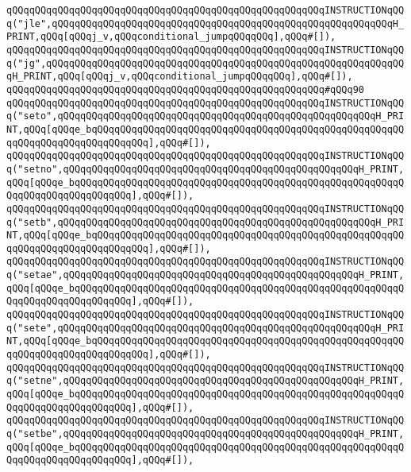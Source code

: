 \verb|qQQqqQQqqQQqqQQqqQQqqQQqqQQqqQQqqQQqqQQqqQQqqQQqqQQqqQQqINSTRUCTIONqQQq("jle",qQQqqQQqqQQqqQQqqQQqqQQqqQQqqQQqqQQqqQQqqQQqqQQqqQQqqQQqqQQqH_PRINT,qQQq[qQQqj_v,qQQqconditional_jumpqQQqqQQq],qQQq#[]),|\newline
\verb|qQQqqQQqqQQqqQQqqQQqqQQqqQQqqQQqqQQqqQQqqQQqqQQqqQQqqQQqINSTRUCTIONqQQq("jg",qQQqqQQqqQQqqQQqqQQqqQQqqQQqqQQqqQQqqQQqqQQqqQQqqQQqqQQqqQQqqQQqH_PRINT,qQQq[qQQqj_v,qQQqconditional_jumpqQQqqQQq],qQQq#[]),|\newline
\verb|qQQqqQQqqQQqqQQqqQQqqQQqqQQqqQQqqQQqqQQqqQQqqQQqqQQqqQQq#qQQq90|\newline
\verb|qQQqqQQqqQQqqQQqqQQqqQQqqQQqqQQqqQQqqQQqqQQqqQQqqQQqqQQqINSTRUCTIONqQQq("seto",qQQqqQQqqQQqqQQqqQQqqQQqqQQqqQQqqQQqqQQqqQQqqQQqqQQqqQQqH_PRINT,qQQq[qQQqe_bqQQqqQQqqQQqqQQqqQQqqQQqqQQqqQQqqQQqqQQqqQQqqQQqqQQqqQQqqQQqqQQqqQQqqQQqqQQqqQQq],qQQq#[]),|\newline
\verb|qQQqqQQqqQQqqQQqqQQqqQQqqQQqqQQqqQQqqQQqqQQqqQQqqQQqqQQqINSTRUCTIONqQQq("setno",qQQqqQQqqQQqqQQqqQQqqQQqqQQqqQQqqQQqqQQqqQQqqQQqqQQqH_PRINT,qQQq[qQQqe_bqQQqqQQqqQQqqQQqqQQqqQQqqQQqqQQqqQQqqQQqqQQqqQQqqQQqqQQqqQQqqQQqqQQqqQQqqQQqqQQq],qQQq#[]),|\newline
\verb|qQQqqQQqqQQqqQQqqQQqqQQqqQQqqQQqqQQqqQQqqQQqqQQqqQQqqQQqINSTRUCTIONqQQq("setb",qQQqqQQqqQQqqQQqqQQqqQQqqQQqqQQqqQQqqQQqqQQqqQQqqQQqqQQqH_PRINT,qQQq[qQQqe_bqQQqqQQqqQQqqQQqqQQqqQQqqQQqqQQqqQQqqQQqqQQqqQQqqQQqqQQqqQQqqQQqqQQqqQQqqQQqqQQq],qQQq#[]),|\newline
\verb|qQQqqQQqqQQqqQQqqQQqqQQqqQQqqQQqqQQqqQQqqQQqqQQqqQQqqQQqINSTRUCTIONqQQq("setae",qQQqqQQqqQQqqQQqqQQqqQQqqQQqqQQqqQQqqQQqqQQqqQQqqQQqH_PRINT,qQQq[qQQqe_bqQQqqQQqqQQqqQQqqQQqqQQqqQQqqQQqqQQqqQQqqQQqqQQqqQQqqQQqqQQqqQQqqQQqqQQqqQQqqQQq],qQQq#[]),|\newline
\verb|qQQqqQQqqQQqqQQqqQQqqQQqqQQqqQQqqQQqqQQqqQQqqQQqqQQqqQQqINSTRUCTIONqQQq("sete",qQQqqQQqqQQqqQQqqQQqqQQqqQQqqQQqqQQqqQQqqQQqqQQqqQQqqQQqH_PRINT,qQQq[qQQqe_bqQQqqQQqqQQqqQQqqQQqqQQqqQQqqQQqqQQqqQQqqQQqqQQqqQQqqQQqqQQqqQQqqQQqqQQqqQQqqQQq],qQQq#[]),|\newline
\verb|qQQqqQQqqQQqqQQqqQQqqQQqqQQqqQQqqQQqqQQqqQQqqQQqqQQqqQQqINSTRUCTIONqQQq("setne",qQQqqQQqqQQqqQQqqQQqqQQqqQQqqQQqqQQqqQQqqQQqqQQqqQQqH_PRINT,qQQq[qQQqe_bqQQqqQQqqQQqqQQqqQQqqQQqqQQqqQQqqQQqqQQqqQQqqQQqqQQqqQQqqQQqqQQqqQQqqQQqqQQqqQQq],qQQq#[]),|\newline
\verb|qQQqqQQqqQQqqQQqqQQqqQQqqQQqqQQqqQQqqQQqqQQqqQQqqQQqqQQqINSTRUCTIONqQQq("setbe",qQQqqQQqqQQqqQQqqQQqqQQqqQQqqQQqqQQqqQQqqQQqqQQqqQQqH_PRINT,qQQq[qQQqe_bqQQqqQQqqQQqqQQqqQQqqQQqqQQqqQQqqQQqqQQqqQQqqQQqqQQqqQQqqQQqqQQqqQQqqQQqqQQqqQQq],qQQq#[]),|\newline
